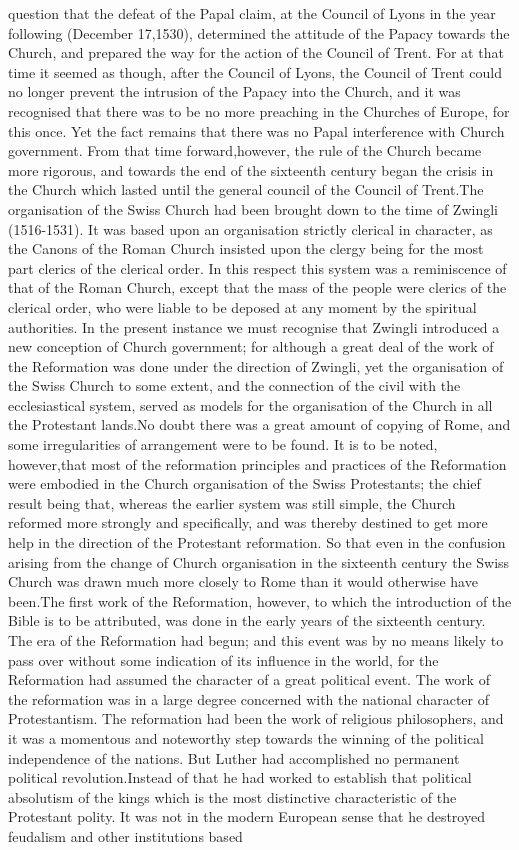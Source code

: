 \documentclass[a4paper]{article}
\begin{document}
question that the defeat of the Papal claim, at the Council of Lyons in the year following (December 17,1530), determined the attitude of the Papacy towards the Church, and prepared the way for the action of the Council of Trent. For at that time it seemed as though, after the Council of Lyons, the Council of Trent could no longer prevent the intrusion of the Papacy into the Church, and it was recognised that there was to be no more preaching in the Churches of Europe, for this once. Yet the fact remains that there was no Papal interference with Church government. From that time forward,however, the rule of the Church became more rigorous, and towards the end of the sixteenth century began the crisis in the Church which lasted until the general council of the Council of Trent.The organisation of the Swiss Church had been brought down to the time of Zwingli (1516-1531). It was based upon an organisation strictly clerical in character, as the Canons of the Roman Church insisted upon the clergy being for the most part clerics of the clerical order. In this respect this system was a reminiscence of that of the Roman Church, except that the mass of the people were clerics of the clerical order, who were liable to be deposed at any moment by the spiritual authorities. In the present instance we must recognise that Zwingli introduced a new conception of Church government; for although a great deal of the work of the Reformation was done under the direction of Zwingli, yet the organisation of the Swiss Church to some extent, and the connection of the civil with the ecclesiastical system, served as models for the organisation of the Church in all the Protestant lands.No doubt there was a great amount of copying of Rome, and some irregularities of arrangement were to be found. It is to be noted, however,that most of the reformation principles and practices of the Reformation were embodied in the Church organisation of the Swiss Protestants; the chief result being that, whereas the earlier system was still simple, the Church reformed more strongly and specifically, and was thereby destined to get more help in the direction of the Protestant reformation. So that even in the confusion arising from the change of Church organisation in the sixteenth century the Swiss Church was drawn much more closely to Rome than it would otherwise have been.The first work of the Reformation, however, to which the introduction of the Bible is to be attributed, was done in the early years of the sixteenth century. The era of the Reformation had begun; and this event was by no means likely to pass over without some indication of its influence in the world, for the Reformation had assumed the character of a great political event. The work of the reformation was in a large degree concerned with the national character of Protestantism. The reformation had been the work of religious philosophers, and it was a momentous and noteworthy step towards the winning of the political independence of the nations. But Luther had accomplished no permanent political revolution.Instead of that he had worked to establish that political absolutism of the kings which is the most distinctive characteristic of the Protestant polity. It was not in the modern European sense that he destroyed feudalism and other institutions based 
\end{document}
